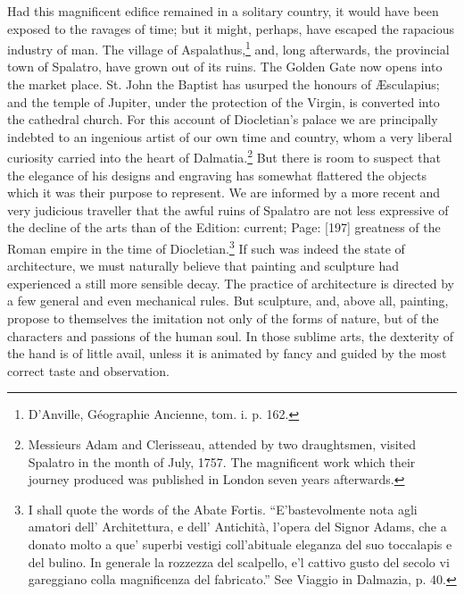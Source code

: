Had this magnificent edifice remained in a solitary country, it would have been exposed to the ravages of time; but it might, perhaps, have escaped the rapacious industry of man. The village of Aspalathus,\footnote{D\texthebrew{}’Anville, Géographie Ancienne, tom. i. p. 162.} and, long afterwards, the provincial town of Spalatro, have grown out of its ruins. The Golden Gate now opens into the market place. St. John the Baptist has usurped the honours of Æsculapius; and the temple of Jupiter, under the protection of the Virgin, is converted into the cathedral church. For this account of Diocletian\texthebrew{}’s palace we are principally indebted to an ingenious artist of our own time and country, whom a very liberal curiosity carried into the heart of Dalmatia.\footnote{Messieurs Adam and Clerisseau, attended by two draughtsmen, visited Spalatro in the month of July, 1757. The magnificent work which their journey produced was published in London seven years afterwards.} But there is room to suspect that the elegance of his designs and engraving has somewhat flattered the objects which it was their purpose to represent. We are informed by a more recent and very judicious traveller that the awful ruins of Spalatro are not less expressive of the decline of the arts than of the Edition: current; Page: [197] greatness of the Roman empire in the time of Diocletian.\footnote{I shall quote the words of the Abate Fortis. \texthebrew{“}E\texthebrew{}’bastevolmente nota agli amatori dell\texthebrew{}’ Architettura, e dell\texthebrew{}’ Antichità, l\texthebrew{}’opera del Signor Adams, che a donato molto a que\texthebrew{}’ superbi vestigi coll\texthebrew{}’abituale eleganza del suo toccalapis e del bulino. In generale la rozzezza del scalpello, e\texthebrew{}’l cattivo gusto del secolo vi gareggiano colla magnificenza del fabricato.\texthebrew{}” See Viaggio in Dalmazia, p. 40.} If such was indeed the state of architecture, we must naturally believe that painting and sculpture had experienced a still more sensible decay. The practice of architecture is directed by a few general and even mechanical rules. But sculpture, and, above all, painting, propose to themselves the imitation not only of the forms of nature, but of the characters and passions of the human soul. In those sublime arts, the dexterity of the hand is of little avail, unless it is animated by fancy and guided by the most correct taste and observation.

